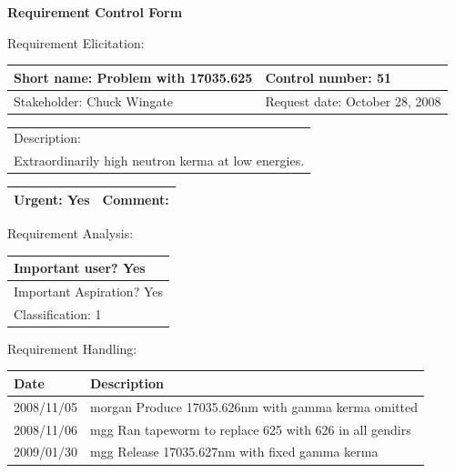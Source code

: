 \begin{center}\Large\bf
Requirement Control Form
\end{center}
\vspace{24pt}

Requirement Elicitation:

\begin{tabular}{|p{211pt}|p{211pt}|} \hline
Short name: Problem with 17035.625 & Control number: 51\\ \hline
Stakeholder: Chuck Wingate & Request date: October 28, 2008\\
\end{tabular}
\begin{tabular}{|p{433pt}|} \hline
Description: \\ 
Extraordinarily high neutron kerma at low energies.\\
\hline
\end{tabular} 
\begin{tabular}{|p{211pt}|p{211pt}|} \hline
Urgent: Yes & Comment: \\ \hline
\end{tabular}

\vspace{24pt}

Requirement Analysis:

\begin{tabular}{|p{433pt}|} \hline
Important user? Yes \\ \hline
Important Aspiration? Yes \\ \hline
Classification: 1 \\ \hline
\end{tabular}
\vspace{24pt}

Requirement Handling:

\begin{tabular}{|p{72pt}|p{351pt}|} \hline
Date & Description \\ \hline
2008/11/05 & morgan Produce 17035.626nm with gamma kerma omitted \\
\hline
2008/11/06 & mgg Ran tapeworm to replace 625 with 626 in all gendirs
\\ \hline
2009/01/30 & mgg Release 17035.627nm with fixed gamma kerma \\ \hline
\end{tabular}
